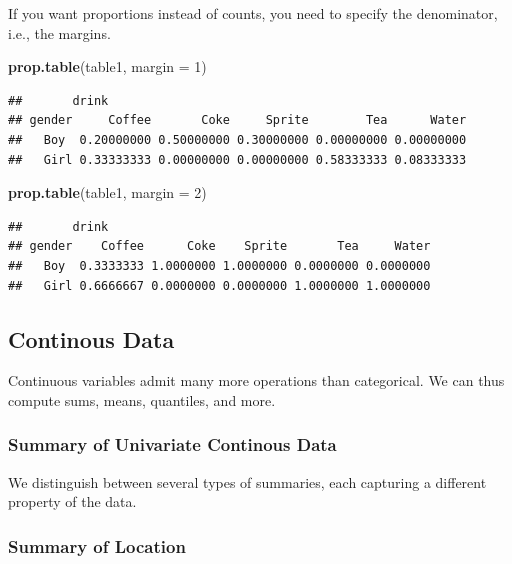 \documentclass[]{book}
\newenvironment{Shaded}{\begin{snugshade}}{\end{snugshade}}
\newcommand{\KeywordTok}[1]{\textcolor[rgb]{0.13,0.29,0.53}{\textbf{{#1}}}}
\newcommand{\DataTypeTok}[1]{\textcolor[rgb]{0.13,0.29,0.53}{{#1}}}
\newcommand{\DecValTok}[1]{\textcolor[rgb]{0.00,0.00,0.81}{{#1}}}
\newcommand{\NormalTok}[1]{{#1}}
\theoremstyle{definition}
\theoremstyle{definition}
\theoremstyle{remark}
\begin{document}
If you want proportions instead of counts, you need to specify the
denominator, i.e., the margins.

\begin{Shaded}
\begin{Highlighting}[]
\KeywordTok{prop.table}\NormalTok{(table1, }\DataTypeTok{margin =} \DecValTok{1}\NormalTok{)}
\end{Highlighting}
\end{Shaded}

\begin{verbatim}
##       drink
## gender     Coffee       Coke     Sprite        Tea      Water
##   Boy  0.20000000 0.50000000 0.30000000 0.00000000 0.00000000
##   Girl 0.33333333 0.00000000 0.00000000 0.58333333 0.08333333
\end{verbatim}

\begin{Shaded}
\begin{Highlighting}[]
\KeywordTok{prop.table}\NormalTok{(table1, }\DataTypeTok{margin =} \DecValTok{2}\NormalTok{)}
\end{Highlighting}
\end{Shaded}

\begin{verbatim}
##       drink
## gender    Coffee      Coke    Sprite       Tea     Water
##   Boy  0.3333333 1.0000000 1.0000000 0.0000000 0.0000000
##   Girl 0.6666667 0.0000000 0.0000000 1.0000000 1.0000000
\end{verbatim}

\subsection{Continous Data}\label{continous-data}

Continuous variables admit many more operations than categorical. We can
thus compute sums, means, quantiles, and more.

\subsubsection{Summary of Univariate Continous
Data}\label{summary-of-univariate-continous-data}

We distinguish between several types of summaries, each capturing a
different property of the data.

\subsubsection{Summary of Location}\label{summary-of-location}
\end{document}
